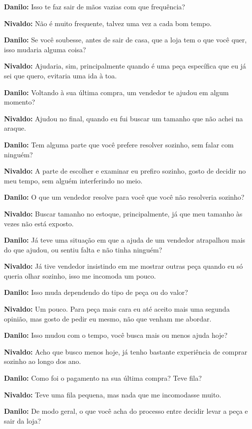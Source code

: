 \textbf{Danilo:} Isso te faz sair de mãos vazias com que frequência?

\textbf{Nivaldo:} Não é muito frequente, talvez uma vez a cada bom tempo.

\textbf{Danilo:} Se você soubesse, antes de sair de casa, que a loja tem o que você quer, isso mudaria alguma coisa?

\textbf{Nivaldo:} Ajudaria, sim, principalmente quando é uma peça específica que eu já sei que quero, evitaria uma ida à toa.

\textbf{Danilo:} Voltando à sua última compra, um vendedor te ajudou em algum momento?

\textbf{Nivaldo:} Ajudou no final, quando eu fui buscar um tamanho que não achei na araque.

\textbf{Danilo:} Tem alguma parte que você prefere resolver sozinho, sem falar com ninguém?

\textbf{Nivaldo:} A parte de escolher e examinar eu prefiro sozinho, gosto de decidir no meu tempo, sem alguém interferindo no meio.

\textbf{Danilo:} O que um vendedor resolve para você que você não resolveria sozinho?

\textbf{Nivaldo:} Buscar tamanho no estoque, principalmente, já que meu tamanho às vezes não está exposto.

\textbf{Danilo:} Já teve uma situação em que a ajuda de um vendedor atrapalhou mais do que ajudou, ou sentiu falta e não tinha ninguém?

\textbf{Nivaldo:} Já tive vendedor insistindo em me mostrar outras peça quando eu só queria olhar sozinho, isso me incomoda um pouco.

\textbf{Danilo:} Isso muda dependendo do tipo de peça ou do valor?

\textbf{Nivaldo:} Um pouco. Para peça mais cara eu até aceito mais uma segunda opinião, mas gosto de pedir eu mesmo, não que venham me abordar.

\textbf{Danilo:} Isso mudou com o tempo, você busca mais ou menos ajuda hoje?

\textbf{Nivaldo:} Acho que busco menos hoje, já tenho bastante experiência de comprar sozinho ao longo dos ano.

\textbf{Danilo:} Como foi o pagamento na sua última compra? Teve fila?

\textbf{Nivaldo:} Teve uma fila pequena, mas nada que me incomodasse muito.

\textbf{Danilo:} De modo geral, o que você acha do processo entre decidir levar a peça e sair da loja?

